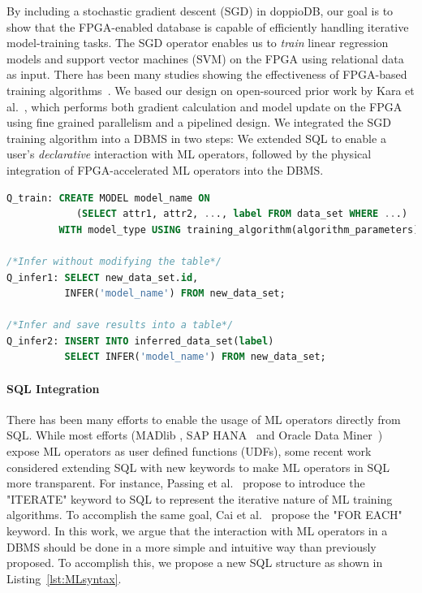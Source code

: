 \documentclass[11pt,dvipdfm]{article}
\begin{document}
By including a stochastic gradient descent (SGD) in doppioDB, our goal is to show that the FPGA-enabled database is capable of efficiently handling iterative model-training tasks. The SGD operator enables us to \textit{train} linear regression models and support vector machines (SVM) on the FPGA using relational data as input. There has been many studies showing the effectiveness of FPGA-based training algorithms~\cite{kesler2011hardware, bin2016fpgasvm, kara2017fpga2, mahajan2018rdbms, he2018flexible}. We based our design on open-sourced prior work by Kara et al.~\cite{kara2017fpga2}, which performs both gradient calculation and model update on the FPGA using fine grained parallelism and a pipelined design.
We integrated the SGD training algorithm into a DBMS in two steps: We extended SQL to enable a user's \textit{declarative} interaction with ML operators, followed by the physical integration of FPGA-accelerated ML operators into the DBMS.

\begin{lstlisting}[float=tp,frame=single,breaklines=true,language=sql,keywords={INSERT,INTO,SELECT,FROM,CREATE,MODEL,ON,USING,WITH,OVER,WHERE,INFER},caption=Template queries to train models on relations and do inference with trained models,basicstyle=\small,label={lst:MLsyntax}]
Q_train: CREATE MODEL model_name ON 
            (SELECT attr1, attr2, ..., label FROM data_set WHERE ...)
         WITH model_type USING training_algorithm(algorithm_parameters);

/*Infer without modifying the table*/
Q_infer1: SELECT new_data_set.id, 
          INFER('model_name') FROM new_data_set;

/*Infer and save results into a table*/
Q_infer2: INSERT INTO inferred_data_set(label)
          SELECT INFER('model_name') FROM new_data_set;
\end{lstlisting}

\paragraph{\textbf{SQL Integration}}
There has been many efforts to enable the usage of ML operators directly from SQL. While most efforts (MADlib \cite{hellerstein2012madlib}, SAP HANA~\cite{farber2012sap} and Oracle Data Miner~\cite{Tamayo2005}) expose ML operators as user defined functions (UDFs), some recent work considered extending SQL with new keywords to make ML operators in SQL more transparent. For instance, Passing et al.~\cite{passing2017sql} propose to introduce the "ITERATE" keyword to SQL to represent the iterative nature of ML training algorithms. To accomplish the same goal, Cai et al.~\cite{cai2013simulation} propose the "FOR EACH" keyword. In this work, we argue that the interaction with ML operators in a DBMS should be done in a more simple and intuitive way than previously proposed. To accomplish this, we propose a new SQL structure as shown in Listing~\ref{lst:MLsyntax}.
\end{document}
